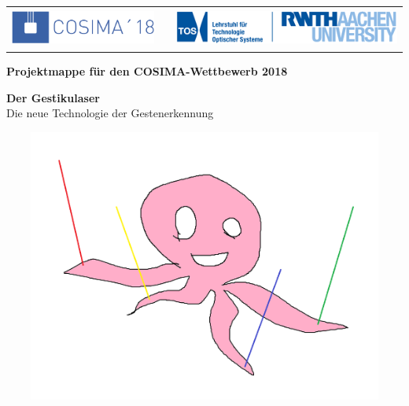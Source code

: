 
\begin{titlepage}

    
	\begin{table}[h!]
		\begin{tabular}{rp{5cm}l}
 		\includegraphics[height=1.25cm]{../Logos/Cosima18.png} & & \includegraphics[height=1.25cm]{../Logos/TOS.png} \\
		\end{tabular}
	\end{table}
    
    \small
	\parindent0pt
	
	\begin{center}
		\bfseries Projektmappe für den COSIMA-Wettbewerb 2018
	\end{center}
	
	\vspace*{15mm}
	\normalsize	
	
	\begin{center}
		\huge
		{\bfseries\sffamily Der Gestikulaser}
		\\ \vspace*{4mm}
		\large
		Die neue Technologie der Gestenerkennung
	\end{center}
	
	\vfill
	
	\begin{center}
	\large \mydate{\today}
	\end{center}
	
	\centering
	\includegraphics[width=15cm,height=9cm]{../figures/GestikulaserLogo.png}
	\vfill
	

\end{titlepage}
